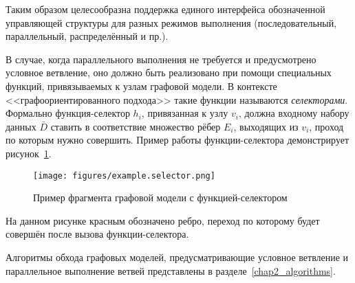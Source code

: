 Таким образом целесообразна поддержка единого интерфейса обозначенной управляющей структуры для разных режимов выполнения (последовательный, параллельный, распределённый и пр.).

В случае, когда параллельного выполнения не требуется и предусмотрено условное ветвление, оно должно быть реализовано при помощи специальных функций, привязываемых к узлам графовой модели. В контексте <<графоориентированного подхода>> такие функции называются \emph{селекторами}. Формально функция-селектор $h_i$, привязанная к узлу $v_i$, должна входному набору данных $\bar{D}$ ставить в соответствие множество рёбер $E_i$, выходящих из $v_i$, проход по которым нужно совершить. Пример работы функции-селектора демонстрирует рисунок~\ref{fig:graphSelector}.

\begin{figure}[H]
    \centering
    \texttt{[image: figures/example.selector.png]}
    \caption{Пример фрагмента графовой модели с функцией-селектором}
    \label{fig:graphSelector}
\end{figure}

На данном рисунке красным обозначено ребро, переход по которому будет совершён после вызова функции-селектора.

Алгоритмы обхода графовых моделей, предусматривающие условное ветвление и параллельное выполнение ветвей представлены в разделе~\ref{chap2_algorithms}.

